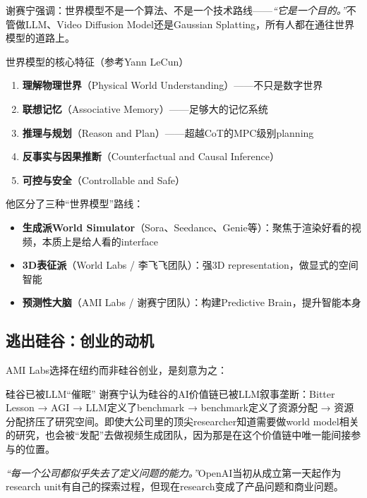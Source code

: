 \documentclass[a4paper]{article}
\begin{document}
谢赛宁强调：世界模型不是一个算法、不是一个技术路线——\textit{``它是一个目的。''}不管做LLM、Video Diffusion Model还是Gaussian Splatting，所有人都在通往世界模型的道路上。

\begin{importantbox}{世界模型的核心特征（参考Yann LeCun）}
\begin{enumerate}
    \item \textbf{理解物理世界}（Physical World Understanding）——不只是数字世界
    \item \textbf{联想记忆}（Associative Memory）——足够大的记忆系统
    \item \textbf{推理与规划}（Reason and Plan）——超越CoT的MPC级别planning
    \item \textbf{反事实与因果推断}（Counterfactual and Causal Inference）
    \item \textbf{可控与安全}（Controllable and Safe）
\end{enumerate}
\end{importantbox}

他区分了三种``世界模型''路线：
\begin{itemize}
    \item \textbf{生成派World Simulator}（Sora、Seedance、Genie等）：聚焦于渲染好看的视频，本质上是给人看的interface
    \item \textbf{3D表征派}（World Labs / 李飞飞团队）：强3D representation，做显式的空间智能
    \item \textbf{预测性大脑}（AMI Labs / 谢赛宁团队）：构建Predictive Brain，提升智能本身
\end{itemize}

\subsection{逃出硅谷：创业的动机}

AMI Labs选择在纽约而非硅谷创业，是刻意为之：

\begin{warningbox}{硅谷已被LLM``催眠''}
谢赛宁认为硅谷的AI价值链已被LLM叙事垄断：Bitter Lesson → AGI → LLM定义了benchmark → benchmark定义了资源分配 → 资源分配挤压了研究空间。即使大公司里的顶尖researcher知道需要做world model相关的研究，也会被``发配''去做视频生成团队，因为那是在这个价值链中唯一能间接参与的位置。

\textit{``每一个公司都似乎失去了定义问题的能力。''}OpenAI当初从成立第一天起作为research unit有自己的探索过程，但现在research变成了产品问题和商业问题。
\end{warningbox}
\end{document}

